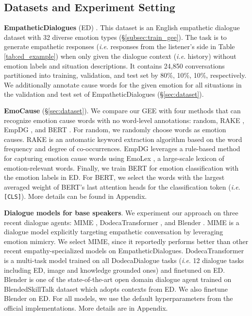 \documentclass[11pt]{article}
\makeatletter
\DeclareRobustCommand\onedot{\futurelet\@let@token\@onedot}
\def\onedot{. }
\def\ie{\emph{i.e}\onedot} \def\Ie{\emph{I.e}\onedot}
\makeatother
\begin{document}
\subsection{Datasets and Experiment Setting}

\textbf{EmpatheticDialogues} (ED) \citep{Rashkin:2019:ACL}.
This dataset is an English empathetic dialogue dataset with 32 diverse emotion types (\S \ref{subsec:train_gee}).
The task is to generate empathetic responses (\ie responses from the listener's side in Table \ref{tab:ed_example}) when only given the dialogue context (\ie history) without emotion labels and situation descriptions.
It contains 24,850 conversations partitioned into training, validation, and test set by 80\%, 10\%, 10\%, respectively.
We additionally annotate cause words for the given emotion for all situations in the validation and test set of EmpatheticDialogues (\S \ref{sec:dataset}).






\textbf{EmoCause} (\S \ref{sec:dataset}).
We compare our GEE with four methods that can recognize emotion cause words with no word-level annotations:
random, RAKE \citep{Rose:2010:rake}, EmpDG \citep{Li:2020:COLING}, and BERT \citep{Devlin:2019:NAACL}.
For random, we randomly choose words as emotion causes.
RAKE is an automatic keyword extraction algorithm based on the word frequency and degree of co-occurrences.
EmpDG leverages a rule-based method for capturing emotion cause words using EmoLex \citep{Mohammad:2013:CI}, a large-scale lexicon of emotion-relevant words.
Finally, we train BERT for emotion classification with the emotion labels in ED.
For BERT, we select the words with the largest averaged weight of BERT's last attention heads for the classification token (\ie \texttt{[CLS]}).
More details can be found in Appendix.

\textbf{Dialogue models for base speakers}.
We experiment our approach on three recent dialogue agents: MIME \citep{Majumder:2020:EMNLP}, DodecaTransformer \citep{Shuster:2020:ACL}, and Blender \citep{Roller:2021:EACL}.
MIME is a dialogue model explicitly targeting empathetic conversation by leveraging emotion mimicry.
We select MIME, since it reportedly performs better than other recent empathy-specialized models \citep{Rashkin:2019:ACL, Lin:2019:EMNLP} on EmpatheticDialogues.
DodecaTransformer is a multi-task model trained on all DodecaDialogue tasks \citep{Shuster:2020:ACL} (\ie 12 dialogue tasks including ED, image and knowledge grounded ones) and finetuned on ED.
Blender is one of the state-of-the-art open domain dialogue agent \citep{Roller:2021:EACL} trained on BlendedSkillTalk dataset \citep{Smith:2020:ACL} which adopts contexts from ED.
We also finetune Blender on ED.
For all models, we use the default hyperparameters from the official implementations.
More details are in Appendix.
\end{document}
